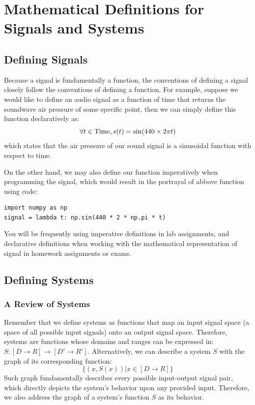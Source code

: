 \chapter{Mathematical Definitions for Signals and Systems}

\section{Defining Signals}
Because a signal is fundamentally a function, the conventions of defining a signal closely follow the conventions of defining a function.
For example, suppose we would like to define an audio signal as a function of time that returns the soundwave air pressure of some specific point, then we can simply define this function declaratively as:
\[
    \forall t \in {\rm Time}, s(t) = \sin(440 \times 2\pi t)
\]
which states that the air pressure of our sound signal is a sinusoidal function with respect to time.

On the other hand, we may also define our function imperatively when programming the signal, which would result in the portrayal of abbove function using code:
\begin{verbatim}
import numpy as np
signal = lambda t: np.sin(440 * 2 * np.pi * t)
\end{verbatim}
You will be frequently using imperative definitions in lab assignments, and declarative definitions when working with the mathematical representation of signal in homework assignments or exams.

\section{Defining Systems}
\subsection{A Review of Systems}
Remember that we define systems as functions that map an input signal space (a space of all possible input signals) onto an output signal space.
Therefore, systems are functions whose domains and ranges can be expressed in: $S: [D \rightarrow R] \rightarrow [D' \rightarrow R']$.
Alternatively, we can describe a system $S$ with the graph of its corresponding function:
\[
    \{(x, S(x)) | x \in [D \rightarrow R]\}
\]
Such graph fundamentally describes every possible input-output signal pair, which directly depicts the system's behavior upon any provided input.
Therefore, we also address the graph of a system's function $S$ as its behavior.

